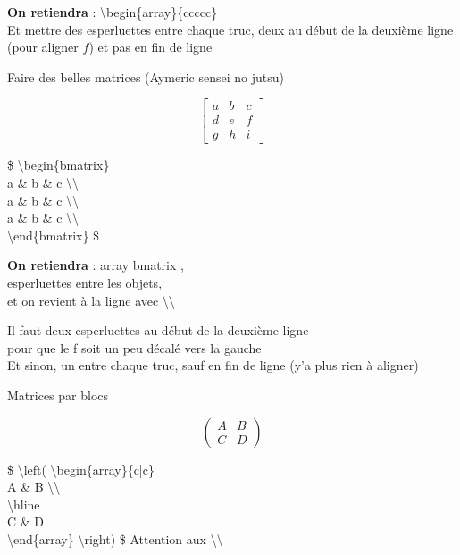 \documentclass{report}
\begin{document}
\textbf{On retiendra} : 
{\selectfont \textbackslash{}begin\{array\}\{ccccc\} } \\
Et mettre des esperluettes entre chaque truc, deux au début de la deuxième ligne (pour aligner $f$)
et pas en fin de ligne

Faire des belles matrices (Aymeric sensei no jutsu)

$$
\begin{bmatrix} 
a & b & c \\
d & e & f \\
g & h & i
\end{bmatrix}
$$

{\selectfont
\$ \textbackslash{}begin\{bmatrix\}  \\
a \& b \& c \textbackslash{}\textbackslash{}  \\
a \& b \& c \textbackslash{}\textbackslash{}  \\
a \& b \& c \textbackslash{}\textbackslash{}  \\
\textbackslash{}end\{bmatrix\} \$
}

\textbf{On retiendra} : {\selectfont array bmatrix }, \\
esperluettes entre les objets, \\
et on revient à la ligne avec {\selectfont \textbackslash{}\textbackslash{} } 



Il faut deux esperluettes au début de la deuxième ligne \\
pour que le f soit un peu décalé vers la gauche \\
Et sinon, un entre chaque truc, sauf en fin de ligne (y'a plus rien à aligner) 

Matrices par blocs

$$
\left(
\begin{array}{c|c}
A & B\\
\hline
C & D
\end{array}
\right)
$$

{\selectfont
\$ \textbackslash{}left( \textbackslash{}begin\{array\}\{c|c\} \\
A \& B \textbackslash{}\textbackslash{} \\
\textbackslash{}hline \\
C \& D \\
\textbackslash{}end\{array\} \textbackslash{}right) \$
} Attention aux \textbackslash{}\textbackslash{}
\end{document}
